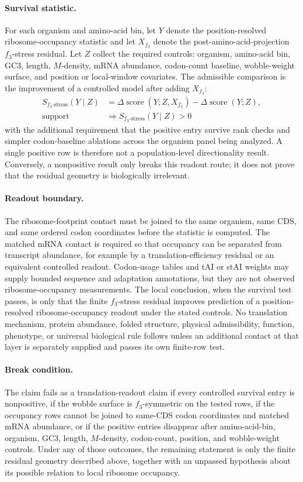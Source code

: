 \paragraph{Survival statistic.}
For each organism and amino-acid bin, let $Y$ denote the position-resolved ribosome-occupancy statistic and let $X_{f_3}$ denote the post-amino-acid-projection $f_3$-stress residual.  Let $Z$ collect the required controls: organism, amino-acid bin, GC3, length, $M$-density, mRNA abundance, codon-count baseline, wobble-weight surface, and position or local-window covariates.  The admissible comparison is the improvement of a controlled model after adding $X_{f_3}$:
$$
\begin{aligned}
S_{f_3\text{-stress}}(Y\mid Z) &= \Delta\operatorname{score}(Y;Z,X_{f_3})-\Delta\operatorname{score}(Y;Z),\\
\text{support} &\Longrightarrow S_{f_3\text{-stress}}(Y\mid Z)>0
\end{aligned}
$$
with the additional requirement that the positive entry survive rank checks and simpler codon-baseline ablations across the organism panel being analyzed.  A single positive row is therefore not a population-level directionality result.  Conversely, a nonpositive result only breaks this readout route; it does not prove that the residual geometry is biologically irrelevant.

\paragraph{Readout boundary.}
The ribosome-footprint contact must be joined to the same organism, same CDS, and same ordered codon coordinates before the statistic is computed.  The matched mRNA contact is required so that occupancy can be separated from transcript abundance, for example by a translation-efficiency residual or an equivalent controlled readout.  Codon-usage tables and tAI or stAI weights may supply bounded sequence and adaptation annotations, but they are not observed ribosome-occupancy measurements.  The local conclusion, when the survival test passes, is only that the finite $f_3$-stress residual improves prediction of a position-resolved ribosome-occupancy readout under the stated controls.  No translation mechanism, protein abundance, folded structure, physical admissibility, function, phenotype, or universal biological rule follows unless an additional contact at that layer is separately supplied and passes its own finite-row test.

\paragraph{Break condition.}
The claim fails as a translation-readout claim if every controlled survival entry is nonpositive, if the wobble surface is $f_3$-symmetric on the tested rows, if the occupancy rows cannot be joined to same-CDS codon coordinates and matched mRNA abundance, or if the positive entries disappear after amino-acid-bin, organism, GC3, length, $M$-density, codon-count, position, and wobble-weight controls.  Under any of those outcomes, the remaining statement is only the finite residual geometry described above, together with an unpassed hypothesis about its possible relation to local ribosome occupancy.
